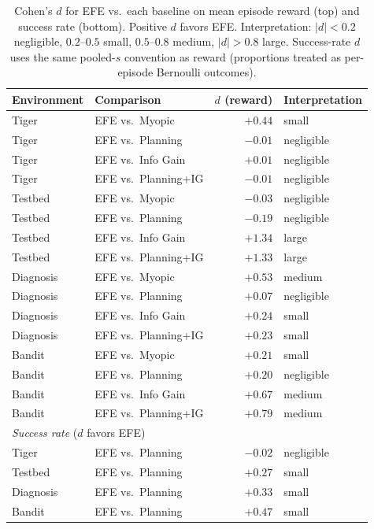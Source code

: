 \documentclass[runningheads]{llncs}
\begin{document}
\begin{table}[h]
\centering
\caption{Cohen's $d$ for EFE vs.\ each baseline on mean episode reward (top) and success rate (bottom). Positive $d$ favors EFE. Interpretation: $|d|{<}0.2$ negligible, $0.2$--$0.5$ small, $0.5$--$0.8$ medium, $|d|{>}0.8$ large. Success-rate $d$ uses the same pooled-$s$ convention as reward (proportions treated as per-episode Bernoulli outcomes).}
\label{tab:effect_sizes}
\begin{small}
\begin{tabular}{llrl}
\toprule
Environment & Comparison & $d$ (reward) & Interpretation \\
\midrule
Tiger & EFE vs.\ Myopic & $+0.44$ & small \\
Tiger & EFE vs.\ Planning & $-0.01$ & negligible \\
Tiger & EFE vs.\ Info Gain & $+0.01$ & negligible \\
Tiger & EFE vs.\ Planning+IG & $-0.01$ & negligible \\
\midrule
Testbed & EFE vs.\ Myopic & $-0.03$ & negligible \\
Testbed & EFE vs.\ Planning & $-0.19$ & negligible \\
Testbed & EFE vs.\ Info Gain & $+1.34$ & large \\
Testbed & EFE vs.\ Planning+IG & $+1.33$ & large \\
\midrule
Diagnosis & EFE vs.\ Myopic & $+0.53$ & medium \\
Diagnosis & EFE vs.\ Planning & $+0.07$ & negligible \\
Diagnosis & EFE vs.\ Info Gain & $+0.24$ & small \\
Diagnosis & EFE vs.\ Planning+IG & $+0.23$ & small \\
\midrule
Bandit & EFE vs.\ Myopic & $+0.21$ & small \\
Bandit & EFE vs.\ Planning & $+0.20$ & negligible \\
Bandit & EFE vs.\ Info Gain & $+0.67$ & medium \\
Bandit & EFE vs.\ Planning+IG & $+0.79$ & medium \\
\midrule
\multicolumn{4}{l}{\textit{Success rate} ($d$ favors EFE)} \\
\midrule
Tiger & EFE vs.\ Planning & $-0.02$ & negligible \\
Testbed & EFE vs.\ Planning & $+0.27$ & small \\
Diagnosis & EFE vs.\ Planning & $+0.33$ & small \\
Bandit & EFE vs.\ Planning & $+0.47$ & small \\
\bottomrule
\end{tabular}
\end{small}
\end{table}
\end{document}
